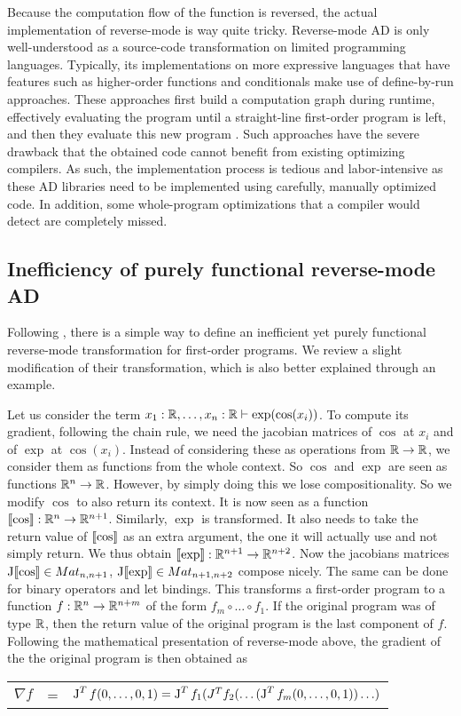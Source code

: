 Because the computation flow of the function is reversed, the actual implementation of reverse-mode is way quite tricky. 
Reverse-mode AD is only well-understood as a source-code transformation on limited programming languages. 
Typically, its implementations on more expressive languages that have features such as higher-order functions and conditionals
make use of define-by-run approaches. These approaches first build a computation graph during runtime, effectively evaluating the program until a straight-line
first-order program is left, and then they evaluate this new program \cite{carpenter2015stan,paszke2017automatic}. 
Such approaches have the severe drawback that the obtained code cannot benefit from existing optimizing compilers.
As such, the implementation process is tedious and labor-intensive as these AD libraries need to be implemented using carefully, manually optimized code.
In addition, some whole-program optimizations that a compiler would detect are completely missed.

\subsection{Inefficiency of purely functional reverse-mode AD}

Following \cite{pearlmutter2008reverse}, there is a simple way to define an inefficient yet purely functional reverse-mode transformation for first-order programs.
We review a slight modification of their transformation, which is also better explained through an example. 

Let us consider the term $x_1:\mathbb{R},\ldots,x_n:\mathbb{R}\vdash \exp(\cos(x_i))$.
To compute its gradient, following the chain rule, we need the jacobian matrices of $\cos$ at $x_i$ and of $\exp$ at $\cos(x_i)$. 
Instead of considering these as operations from $\mathbb{R}\to\mathbb{R}$, we consider them as functions from the whole context. So $\cos$ and $\exp$ are seen as functions $\mathbb{R}^n\to\mathbb{R}$.
However, by simply doing this we lose compositionality. 
So we modify $\cos$ to also return its context. It is now seen as a function $\llbracket \cos\rrbracket:\mathbb{R}^n\to\mathbb{R}^{n+1}$.
Similarly, $\exp$ is transformed. It also needs to take the return value of $\llbracket \cos\rrbracket$ as an extra argument, the one it will actually use and not simply return. 
We thus obtain $\llbracket \exp\rrbracket:\mathbb{R}^{n+1}\to\mathbb{R}^{n+2}$. Now the jacobians matrices $\operatorname{J}\llbracket \cos\rrbracket \in Mat_{n,n+1}$, $\operatorname{J}\llbracket \exp\rrbracket \in Mat_{n+1,n+2}$ compose nicely.
The same can be done for binary operators and let bindings.
This transforms a first-order program to a function $f:\mathbb{R}^n\to\mathbb{R}^{n+m}$ of the form $f_m\circ\ldots\circ f_1$. 
If the original program was of type $\mathbb{R}$, then the return value of the original program is the last component of $f$.
Following the mathematical presentation of reverse-mode above, the gradient of the the original program is then obtained as 
\begin{center}
    \begin{tabular}{r c l}
        $\nabla f$ &=& $\operatorname{J}^Tf(0,\ldots,0,1)= \operatorname{J}^Tf_1(J^Tf_{2}(\ldots(\operatorname{J}^Tf_m(0,\ldots,0,1))\ldots)$
    \end{tabular}
\end{center}

